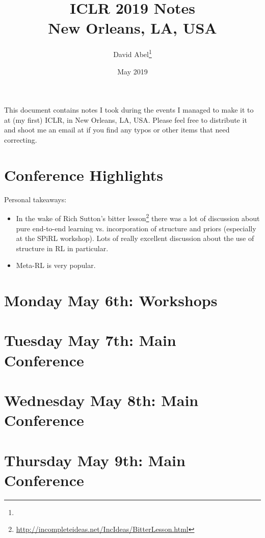 \documentclass[11pt]{article}
\title{ICLR 2019 Notes \\ \Large{New Orleans, LA, USA}}
\author{David Abel\footnote{\durl{http://david-abel.github.io}} \\ \durl{david_abel@brown.edu}}
\date{May 2019}
\begin{document}
\maketitle
\tableofcontents
\newpage


This document contains notes I took during the events I managed to make it to at (my first) ICLR, in New Orleans, LA, USA. Please feel free to distribute it and shoot me an email at  if you find any typos or other items that need correcting.



\section{Conference Highlights}


Personal takeaways:
\begin{itemize}
    \item In the wake of Rich Sutton's bitter lesson\footnote{\url{http://incompleteideas.net/IncIdeas/BitterLesson.html}} there was a lot of discussion about pure end-to-end learning vs. incorporation of structure and priors (especially at the SPiRL workshop). Lots of really excellent discussion about the use of structure in RL in particular.
    \item Meta-RL is very popular.
\end{itemize}

\newpage
\section{Monday May 6th: Workshops}




\newpage
\section{Tuesday May 7th: Main Conference}




\newpage
\section{Wednesday May 8th: Main Conference}




\newpage
\section{Thursday May 9th: Main Conference}






\newpage


\end{document}
